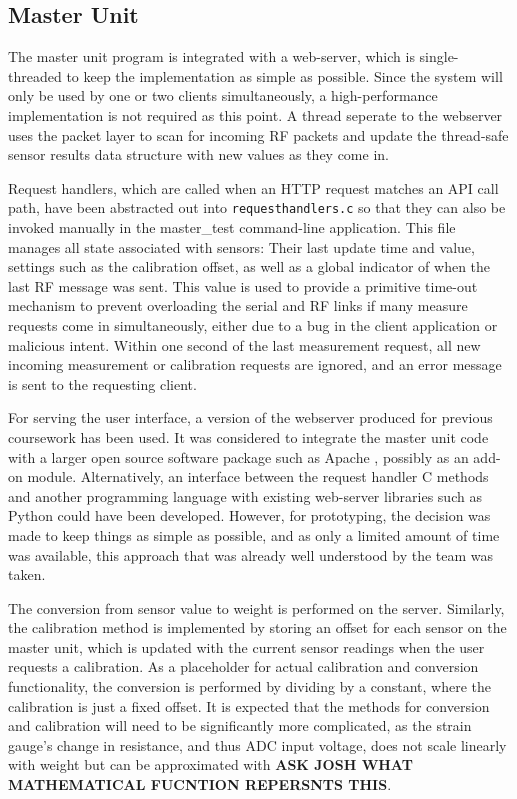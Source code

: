 \subsection{Master Unit}
The master unit program is integrated with a web-server, which is single-threaded to keep the implementation as simple as possible. Since the system will only be used by one or two clients simultaneously, a high-performance implementation is not required as this point. A thread seperate to the webserver uses the packet layer to scan for incoming RF packets and update the thread-safe sensor results data structure with new values as they come in.

Request handlers, which are called when an HTTP request matches an API call path, have been abstracted out into \texttt{requesthandlers.c} so that they can also be invoked manually in the master\_test command-line application. This file manages all state associated with sensors: Their last update time and value, settings such as the calibration offset, as well as a global indicator of when the last RF message was sent. This value is used to provide a primitive time-out mechanism to prevent overloading the serial and RF links if many measure requests come in simultaneously, either due to a bug in the client application or malicious intent. Within one second of the last measurement request, all new incoming measurement or calibration requests are ignored, and an error message is sent to the requesting client.

For serving the user interface, a version of the webserver produced for previous coursework\cite{ns3-coursework} has been used. It was considered to integrate the master unit code with a larger open source software package such as Apache \cite{apache}, possibly as an add-on module. Alternatively, an interface between the request handler C methods and another programming language with existing web-server libraries such as Python could have been developed. However, for prototyping, the decision was made to keep things as simple as possible, and as only a limited amount of time was available, this approach that was already well understood by the team was taken.

The conversion from sensor value to weight is performed on the server. Similarly, the calibration method is implemented by storing an offset for each sensor on the master unit, which is updated with the current sensor readings when the user requests a calibration. As a placeholder for actual calibration and conversion functionality, the conversion is performed by dividing by a constant, where the calibration is just a fixed offset. It is expected that the methods for conversion and calibration will need to be significantly more complicated, as the strain gauge's change in resistance, and thus ADC input voltage, does not scale linearly with weight but can be approximated with \textbf{ASK JOSH WHAT MATHEMATICAL FUCNTION REPERSNTS THIS}.

